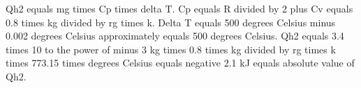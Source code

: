Qh2 equals mg times Cp times delta T. Cp equals R divided by 2 plus Cv equals 0.8 times kg divided by rg times k. Delta T equals 500 degrees Celsius minus 0.002 degrees Celsius approximately equals 500 degrees Celsius. Qh2 equals 3.4 times 10 to the power of minus 3 kg times 0.8 times kg divided by rg times k times 773.15 times degrees Celsius equals negative 2.1 kJ equals absolute value of Qh2.